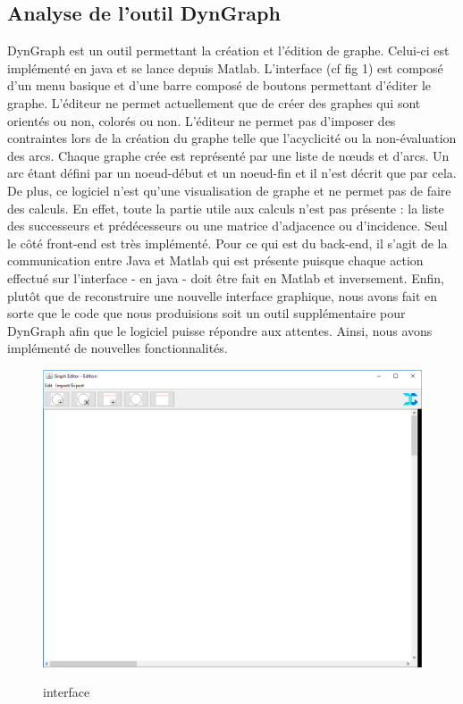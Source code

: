 \documentclass[conference]{IEEEtran}
\begin{document}
\subsection{Analyse de l'outil DynGraph}
\vspace{0.3cm} 

DynGraph est un outil permettant la création et l'édition de graphe. Celui-ci est implémenté en java et se lance depuis Matlab.
L'interface (cf fig 1) est composé d'un menu basique et d'une barre composé de boutons permettant d'éditer le graphe. L'éditeur ne permet actuellement que de créer des graphes qui sont orientés ou non, colorés ou non. L'éditeur ne permet pas d'imposer des contraintes lors de la création du graphe telle que l'acyclicité ou la non-évaluation des arcs. Chaque graphe crée est représenté par une liste de nœuds et d'arcs. Un arc étant défini par un noeud-début et un noeud-fin et il n'est décrit que par cela. De plus, ce logiciel n'est qu'une visualisation de graphe et ne permet pas de faire des calculs. En effet, toute la partie utile aux calculs n'est pas présente : la liste des successeurs et prédécesseurs ou une matrice d'adjacence ou d'incidence. Seul le côté front-end est très implémenté. Pour ce qui est du back-end, il s'agit de la communication entre Java et Matlab qui est présente puisque chaque action effectué sur l'interface - en java - doit être fait en Matlab et inversement. Enfin, plutôt que de reconstruire une nouvelle interface graphique, nous avons fait en sorte que le code que nous produisions soit un outil supplémentaire pour DynGraph afin que le logiciel puisse répondre aux attentes. Ainsi, nous avons implémenté de nouvelles fonctionnalités. 


\begin{figure}[!h]
\begin{center}
\includegraphics[scale=0.30]{Dyngraph.png}\\
\caption{interface}
\label{fig 1}
\end{center}
\end{figure}
\end{document}
